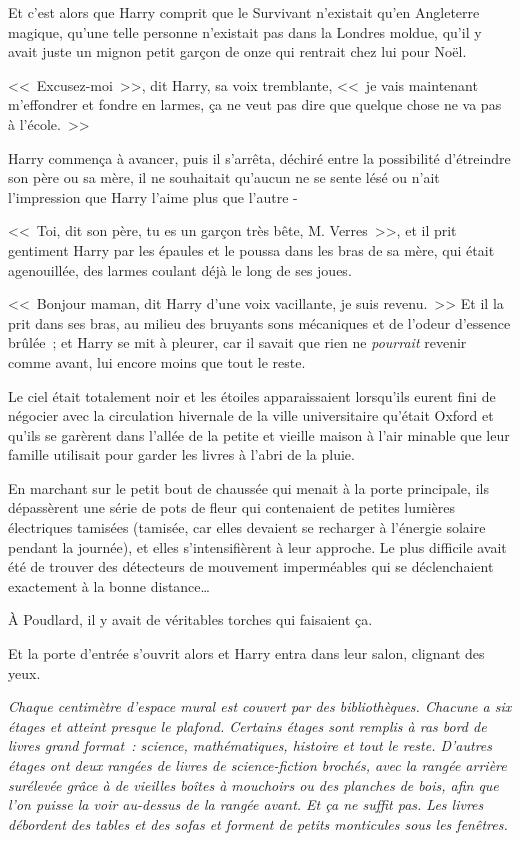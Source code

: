Et c'est alors que Harry comprit que le Survivant n'existait qu'en Angleterre magique, qu'une telle personne n'existait pas dans la Londres moldue, qu'il y avait juste un mignon petit garçon de onze qui rentrait chez lui pour Noël.

<<~Excusez-moi~>>, dit Harry, sa voix tremblante, <<~je vais maintenant m'effondrer et fondre en larmes, ça ne veut pas dire que quelque chose ne va pas à l'école.~>>

Harry commença à avancer, puis il s'arrêta, déchiré entre la possibilité d'étreindre son père ou sa mère, il ne souhaitait qu'aucun ne se sente lésé ou n'ait l'impression que Harry l'aime plus que l'autre -

<<~Toi, dit son père, tu es un garçon très bête, M. Verres~>>, et il prit gentiment Harry par les épaules et le poussa dans les bras de sa mère, qui était agenouillée, des larmes coulant déjà le long de ses joues.

<<~Bonjour maman, dit Harry d'une voix vacillante, je suis revenu.~>> Et il la prit dans ses bras, au milieu des bruyants sons mécaniques et de l'odeur d'essence brûlée~; et Harry se mit à pleurer, car il savait que rien ne \emph{pourrait} revenir comme avant, lui encore moins que tout le reste.

\later

Le ciel était totalement noir et les étoiles apparaissaient lorsqu'ils eurent fini de négocier avec la circulation hivernale de la ville universitaire qu'était Oxford et qu'ils se garèrent dans l'allée de la petite et vieille maison à l'air minable que leur famille utilisait pour garder les livres à l'abri de la pluie.

En marchant sur le petit bout de chaussée qui menait à la porte principale, ils dépassèrent une série de pots de fleur qui contenaient de petites lumières électriques tamisées (tamisée, car elles devaient se recharger à l'énergie solaire pendant la journée), et elles s'intensifièrent à leur approche. Le plus difficile avait été de trouver des détecteurs de mouvement imperméables qui se déclenchaient exactement à la bonne distance…

À Poudlard, il y avait de véritables torches qui faisaient ça.

Et la porte d'entrée s'ouvrit alors et Harry entra dans leur salon, clignant des yeux.

\emph{Chaque centimètre d'espace mural est couvert par des bibliothèques. Chacune a six étages et atteint presque le plafond. Certains étages sont remplis à ras bord de livres grand format~: science, mathématiques, histoire et tout le reste. D'autres étages ont deux rangées de livres de science-fiction brochés, avec la rangée arrière surélevée grâce à de vieilles boîtes à mouchoirs ou des planches de bois, afin que l'on puisse la voir au-dessus de la rangée avant. Et ça ne suffit pas. Les livres débordent des tables et des sofas et forment de petits monticules sous les fenêtres.}

